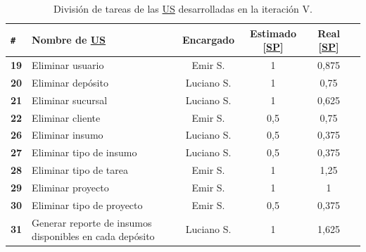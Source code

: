 \documentclass[a4paper, 12pt,twoside]{report}  %
\numberwithin{equation}{subsection} %
\begin{document}
\begin{table}[h!]
	\centering
	\begin{tabular}{ |p{0.5cm}|p{6cm}|c|c|c|c| }
		\hline
		\verb|#|& \textbf{Nombre de \hyperlink{US}{US}}& \textbf{Encargado} & \textbf{Estimado [\hyperlink{SP}{SP}]} & \textbf{Real [\hyperlink{SP}{SP}]} \\
		\hline
		\textbf{19} & Eliminar usuario & \cellcolor{marca_US_emir}Emir S. & 1 & 0,875 \\
		\hline
		\textbf{20} & Eliminar depósito & \cellcolor{marca_US_luciano}Luciano S. & 1 & 0,75 \\
		\hline
		\textbf{21} & Eliminar sucursal & \cellcolor{marca_US_luciano}Luciano S. & 1 & 0,625 \\
		\hline
		\textbf{22} & Eliminar cliente & \cellcolor{marca_US_emir}Emir S. & 0,5 & 0,75 \\
		\hline
		\textbf{26} & Eliminar insumo & \cellcolor{marca_US_luciano}Luciano S. & 0,5 & 0,375 \\
		\hline
		\textbf{27} & Eliminar tipo de insumo & \cellcolor{marca_US_luciano}Luciano S. & 0,5 & 0,375 \\
		\hline
		\textbf{28} & Eliminar tipo de tarea & \cellcolor{marca_US_emir}Emir S. & 1 & 1,25 \\
		\hline
		\textbf{29} & Eliminar proyecto & \cellcolor{marca_US_emir}Emir S. & 1 & 1 \\
		\hline
		\textbf{30} & Eliminar tipo de proyecto & \cellcolor{marca_US_emir}Emir S. & 0,5 & 0,375 \\
		\hline
		\textbf{31} & Generar reporte de insumos disponibles en cada depósito & \cellcolor{marca_US_luciano}Luciano S. & 1 & 1,625 \\
		\hline
	\end{tabular}
	\caption{División de tareas de las \protect\hyperlink{US}{US} desarrolladas en la iteración V.}
	\label{tabla_desarrollo_iter_5}
\end{table}
\end{document}
